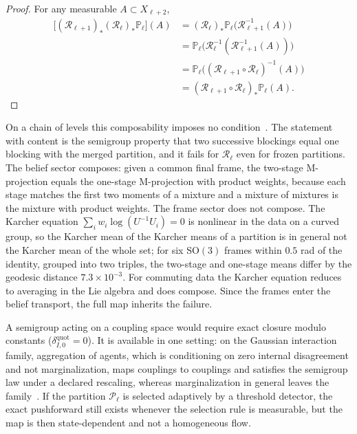 \documentclass[11pt]{article}
\begin{document}
\begin{proof}
For any measurable $A \subset X_{\ell+2}$,
\begin{align*}
\big[(\mathcal{R}_{\ell+1})_*(\mathcal{R}_\ell)_*\mathbb{P}_\ell\big](A)
 &= (\mathcal{R}_\ell)_*\mathbb{P}_\ell\big(\mathcal{R}_{\ell+1}^{-1}(A)\big) \\
 &= \mathbb{P}_\ell\big(\mathcal{R}_\ell^{-1}(\mathcal{R}_{\ell+1}^{-1}(A))\big) \\
 &= \mathbb{P}_\ell\big((\mathcal{R}_{\ell+1} \circ \mathcal{R}_\ell)^{-1}(A)\big) \\
 &= (\mathcal{R}_{\ell+1} \circ \mathcal{R}_\ell)_*\mathbb{P}_\ell(A).
\end{align*}
\end{proof}

On a chain of levels this composability imposes no condition~\cite[Ch.~9]{DennisGaugeVFE2026}. The statement with content is the semigroup property that two successive blockings equal one blocking with the merged partition, and it fails for $\mathcal{R}_\ell$ even for frozen partitions. The belief sector composes: given a common final frame, the two-stage M-projection equals the one-stage M-projection with product weights, because each stage matches the first two moments of a mixture and a mixture of mixtures is the mixture with product weights. The frame sector does not compose. The Karcher equation $\sum_iw_i\log(U^{-1}U_i)=0$ is nonlinear in the data on a curved group, so the Karcher mean of the Karcher means of a partition is in general not the Karcher mean of the whole set; for six $\mathrm{SO}(3)$ frames within $0.5$ rad of the identity, grouped into two triples, the two-stage and one-stage means differ by the geodesic distance $7.3\times10^{-3}$. For commuting data the Karcher equation reduces to averaging in the Lie algebra and does compose. Since the frames enter the belief transport, the full map inherits the failure.

A semigroup acting on a coupling space would require exact closure modulo constants ($\delta_{I,0}^{\mathrm{quot}}=0$). It is available in one setting: on the Gaussian interaction family, aggregation of agents, which is conditioning on zero internal disagreement and not marginalization, maps couplings to couplings and satisfies the semigroup law under a declared rescaling, whereas marginalization in general leaves the family~\cite[Chs.~G7 and G9]{DennisGaugeVFESuppG2026}. If the partition $\mathcal{P}_\ell$ is selected adaptively by a threshold detector, the exact pushforward still exists whenever the selection rule is measurable, but the map is then state-dependent and not a homogeneous flow.
\end{document}
